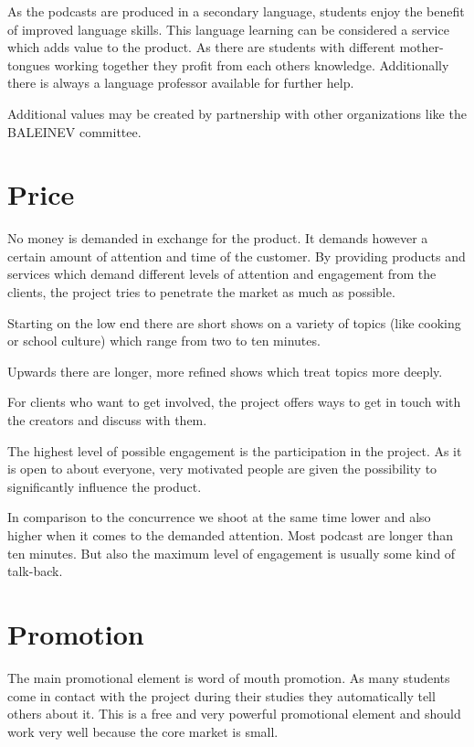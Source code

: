 As the podcasts are produced in a secondary language, students enjoy the
benefit of improved language skills. This language learning can be
considered a service which adds value to the product. As there are
students with different mother-tongues working together they profit from
each others knowledge. Additionally there is always a language professor
available for further help.

Additional values may be created by partnership with other organizations
like the BALEINEV committee.

\section{Price}\label{price}

No money is demanded in exchange for the product. It demands however a
certain amount of attention and time of the customer. By providing
products and services which demand different levels of attention and
engagement from the clients, the project tries to penetrate the market
as much as possible.

Starting on the low end there are short shows on a variety of topics
(like cooking or school culture) which range from two to ten minutes.

Upwards there are longer, more refined shows which treat topics more
deeply.

For clients who want to get involved, the project offers ways to get in
touch with the creators and discuss with them.

The highest level of possible engagement is the participation in the
project. As it is open to about everyone, very motivated people are
given the possibility to significantly influence the product.

In comparison to the concurrence we shoot at the same time lower and
also higher when it comes to the demanded attention. Most podcast are
longer than ten minutes. But also the maximum level of engagement is
usually some kind of talk-back.

\section{Promotion}\label{promotion}

The main promotional element is word of mouth promotion. As many
students come in contact with the project during their studies they
automatically tell others about it. This is a free and very powerful
promotional element and should work very well because the core market is
small.


